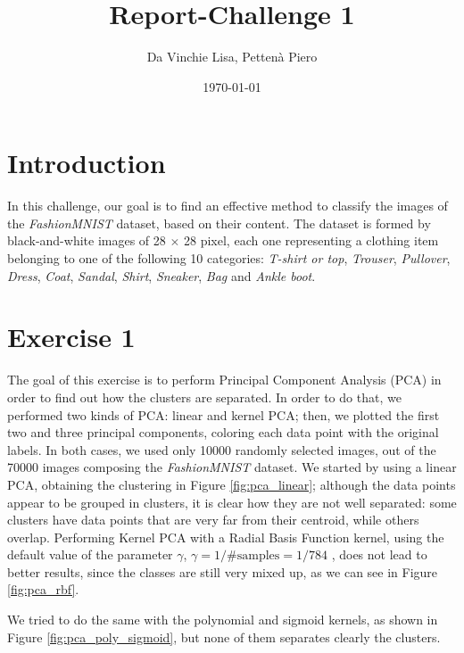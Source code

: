 \documentclass[12pt]{article}
\title{Report-Challenge 1}
\author{Da Vinchie Lisa, Pettenà Piero}
\date{\today} %
\begin{document}
	
	\maketitle
	
	
	
	\section*{Introduction}
	In this challenge, our goal is to find an effective method to classify the images of the \textit{FashionMNIST} dataset, based on their content. The dataset is formed by black-and-white images of 28 $\times$ 28 pixel, each one representing a clothing item belonging to one of the following 10 categories: \textit{T-shirt or top}, \textit{Trouser}, \textit{Pullover}, \textit{Dress}, \textit{Coat}, \textit{Sandal}, \textit{Shirt}, \textit{Sneaker}, \textit{Bag} and \textit{Ankle boot}.
	
	\section*{Exercise 1}
	The goal of this exercise is to perform Principal Component Analysis (PCA) in order to find out how the clusters are separated. In order to do that, we performed two kinds of PCA: linear and kernel PCA; then, we plotted the first two and three principal components, coloring each data point with the original labels. In both cases, we used only 10000 randomly selected images, out of the 70000 images composing the \textit{FashionMNIST} dataset.\newline
	We started by using a linear PCA, obtaining the clustering in Figure \ref{fig:pca_linear}; although the data points appear to be grouped in clusters, it is clear how they are not well separated: some clusters have data points that are very far from their centroid, while others overlap.\newline
	Performing Kernel PCA with a Radial Basis Function kernel, using the default value of the parameter $\gamma$, $\gamma = 1/\mathrm{\# samples} = 1/784$ , does not lead to better results, since the classes are still very mixed up, as we can see in Figure \ref{fig:pca_rbf}.
	
	
	We tried to do the same with the polynomial and sigmoid kernels, as shown in Figure \ref{fig:pca_poly_sigmoid}, but none of them separates clearly the clusters.
	
\end{document}
